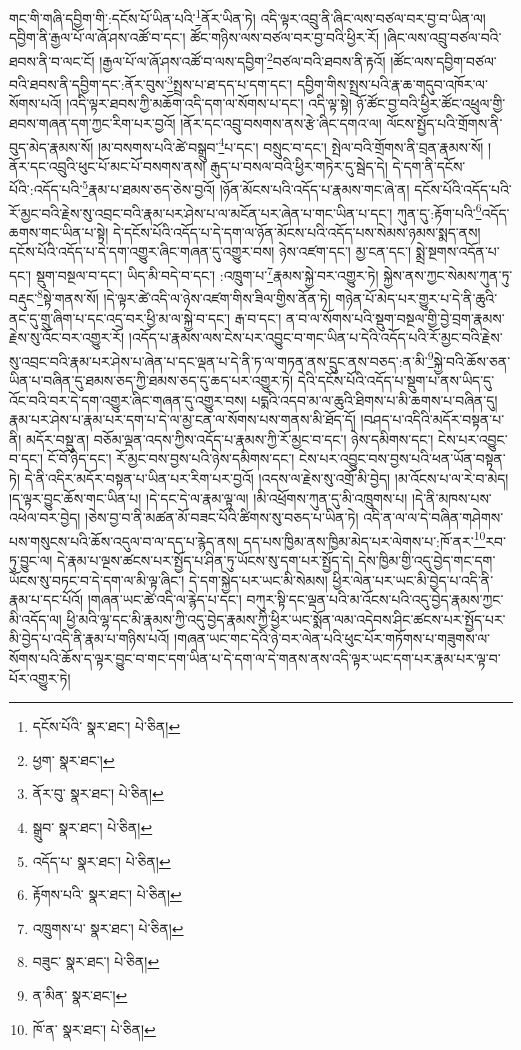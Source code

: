 གང་གི་གཞི་དབྱིག་གི་:དངོས་པོ་ཡིན་པའི་\footnote{དངོས་པོའི་  སྣར་ཐང་།  པེ་ཅིན། }ནོར་ཡིན་ཏེ། འདི་ལྟར་འབྲུ་ནི་ཞིང་ལས་བཙལ་བར་བྱ་བ་ཡིན་ལ། དབྱིག་ནི་རྒྱལ་པོ་ལ་ཞོ་ཤས་འཚོ་བ་དང་། ཚོང་གཉིས་ལས་བཙལ་བར་བྱ་བའི་ཕྱིར་རོ། །ཞིང་ལས་འབྲུ་བཙལ་བའི་ཐབས་ནི་བ་ལང་ངོ། །རྒྱལ་པོ་ལ་ཞོ་ཤས་འཚོ་བ་ལས་དབྱིག་\footnote{ཕྱག་  སྣར་ཐང་། }བཙལ་བའི་ཐབས་ནི་རྟའོ། །ཚོང་ལས་དབྱིག་བཙལ་བའི་ཐབས་ནི་དབྱིག་དང་:ནོར་བུས་\footnote{ནོར་བུ་  སྣར་ཐང་།  པེ་ཅིན། }སྤྲས་པ་ཐ་དད་པ་དག་དང་། དབྱིག་གིས་སྤྲས་པའི་རྣ་ཆ་གདུབ་འཁོར་ལ་སོགས་པའོ། །འདི་ལྟར་ཐབས་ཀྱི་མཆོག་འདི་དག་ལ་སོགས་པ་དང་། འདི་ལྟ་སྟེ། ཉོ་ཚོང་བྱ་བའི་ཕྱིར་ཚོང་འཕྲུལ་གྱི་ཐབས་གཞན་དག་ཀྱང་རིག་པར་བྱའོ། །ནོར་དང་འབྲུ་བསགས་ནས་རྩེ་ཞིང་དགའ་ལ། ལོངས་སྤྱོད་པའི་གྲོགས་ནི་བུད་མེད་རྣམས་སོ། །མ་བསགས་པའི་ཚེ་བསྒྲུབ་\footnote{སྒྲུབ་  སྣར་ཐང་།  པེ་ཅིན། }པ་དང་། བསྲུང་བ་དང་། སྤེལ་བའི་གྲོགས་ནི་བྲན་རྣམས་སོ། །
ནོར་དང་འབྲུའི་ཕུང་པོ་མང་པོ་བསགས་ནས། རྒུད་པ་བསལ་བའི་ཕྱིར་གཏེར་དུ་སྦེད་དེ། དེ་དག་ནི་དངོས་པོའི་:འདོད་པའི་\footnote{འདོད་པ་  སྣར་ཐང་།  པེ་ཅིན། }རྣམ་པ་ཐམས་ཅད་ཅེས་བྱའོ། །ཉོན་མོངས་པའི་འདོད་པ་རྣམས་གང་ཞེ་ན། དངོས་པོའི་འདོད་པའི་རོ་མྱང་བའི་རྗེས་སུ་འབྲང་བའི་རྣམ་པར་ཤེས་པ་ལ་མངོན་པར་ཞེན་པ་གང་ཡིན་པ་དང་། ཀུན་དུ་:རྟོག་པའི་\footnote{རྟོགས་པའི་  སྣར་ཐང་།  པེ་ཅིན། }འདོད་ཆགས་གང་ཡིན་པ་སྟེ། དེ་དངོས་པོའི་འདོད་པ་དེ་དག་ལ་ཉོན་མོངས་པའི་འདོད་པས་སེམས་ཉམས་སྨད་ནས། དངོས་པོའི་འདོད་པ་དེ་དག་འགྱུར་ཞིང་གཞན་དུ་འགྱུར་བས། ཉེས་འཛག་དང་། མྱ་ངན་དང་། སྨྲེ་སྔགས་འདོན་པ་དང་། སྡུག་བསྔལ་བ་དང་། ཡིད་མི་བདེ་བ་དང་། :འཁྲུག་པ་\footnote{འཁྲུགས་པ་  སྣར་ཐང་།  པེ་ཅིན། }རྣམས་སྐྱེ་བར་འགྱུར་ཏེ། སྐྱེས་ནས་ཀྱང་སེམས་ཀུན་ཏུ་བརྡུང་\footnote{བཟུང་  སྣར་ཐང་།  པེ་ཅིན། }སྟེ་གནས་སོ། །དེ་ལྟར་ཚེ་འདི་ལ་ཉེས་འཛག་གིས་ཟིལ་གྱིས་ནོན་ཏེ། གཉེན་པོ་མེད་པར་གྱུར་པ་དེ་ནི་ཆུའི་ནང་དུ་གྲུ་ཞིག་པ་དང་འདྲ་བར་ཕྱི་མ་ལ་སྐྱེ་བ་དང་། རྒ་བ་དང་། ན་བ་ལ་སོགས་པའི་སྡུག་བསྔལ་གྱི་བྱེ་བྲག་རྣམས་རྗེས་སུ་འོང་བར་འགྱུར་རོ། །འདོད་པ་རྣམས་ལས་ངེས་པར་འབྱུང་བ་གང་ཡིན་པ་དེའི་འདོད་པའི་རོ་མྱང་བའི་རྗེས་སུ་འབྲང་བའི་རྣམ་པར་ཤེས་པ་ཞེན་པ་དང་ལྡན་པ་དེ་ནི་ཏ་ལ་གཏན་ནས་དྲུང་ནས་བཅད་:ན་མི་\footnote{ན་མིན་  སྣར་ཐང་། }སྐྱེ་བའི་ཆོས་ཅན་ཡིན་པ་བཞིན་དུ་ཐམས་ཅད་ཀྱི་ཐམས་ཅད་དུ་ཆད་པར་འགྱུར་ཏེ། དེའི་དངོས་པོའི་འདོད་པ་སྡུག་པ་ནས་ཡིད་དུ་འོང་བའི་བར་དེ་དག་འགྱུར་ཞིང་གཞན་དུ་འགྱུར་བས། པདྨའི་འདབ་མ་ལ་ཆུའི་ཐིགས་པ་མི་ཆགས་པ་བཞིན་དུ། རྣམ་པར་ཤེས་པ་རྣམ་པར་དག་པ་དེ་ལ་མྱ་ངན་ལ་སོགས་པས་གནས་མི་ཐོད་དོ། །བཤད་པ་འདིའི་མདོར་བསྟན་པ་ནི། མདོར་བསྡུ་ན། བཅོམ་ལྡན་འདས་ཀྱིས་འདོད་པ་རྣམས་ཀྱི་རོ་མྱང་བ་དང་། ཉེས་དམིགས་དང་། ངེས་པར་འབྱུང་བ་དང་། ངོ་བོ་ཉིད་དང་། རོ་མྱང་བས་བྱས་པའི་ཉེས་དམིགས་དང་། ངེས་པར་འབྱུང་བས་བྱས་པའི་ཕན་ཡོན་བསྟན་ཏེ། དེ་ནི་འདིར་མདོར་བསྟན་པ་ཡིན་པར་རིག་པར་བྱའོ། །འདས་ལ་རྗེས་སུ་འགྲོ་མི་བྱེད། །མ་འོངས་པ་ལ་རེ་བ་མེད། །ད་ལྟར་བྱུང་ཆོས་གང་ཡིན་པ། །དེ་དང་དེ་ལ་རྣམ་ལྟ་ལ། །མི་འཕྲོགས་ཀུན་དུ་མི་འཁྲུགས་པ། །དེ་ནི་མཁས་པས་འཕེལ་བར་བྱེད། །ཅེས་བྱ་བ་ནི་མཚན་མོ་བཟང་པོའི་ཚིགས་སུ་བཅད་པ་ཡིན་ཏེ། འདི་ན་ལ་ལ་དེ་བཞིན་གཤེགས་པས་གསུངས་པའི་ཆོས་འདུལ་བ་ལ་དད་པ་རྙེད་ནས། དད་པས་ཁྱིམ་ནས་ཁྱིམ་མེད་པར་ལེགས་པ་:ཁོ་ནར་\footnote{ཁོ་ན་  སྣར་ཐང་།  པེ་ཅིན། }རབ་ཏུ་བྱུང་ལ། དེ་རྣམ་པ་ལྔས་ཚངས་པར་སྤྱོད་པ་ཤིན་ཏུ་ཡོངས་སུ་དག་པར་སྤྱོད་དེ། དེས་ཁྱིམ་གྱི་འདུ་བྱེད་གང་དག་ཡོངས་སུ་བཏང་བ་དེ་དག་ལ་མི་ལྟ་ཞིང་། དེ་དག་སྐྱེད་པར་ཡང་མི་སེམས། ཕྱིར་ལེན་པར་ཡང་མི་བྱེད་པ་འདི་ནི་རྣམ་པ་དང་པོའོ། །གཞན་ཡང་ཚེ་འདི་ལ་རྙེད་པ་དང་། བཀུར་སྟི་དང་ལྡན་པའི་མ་འོངས་པའི་འདུ་བྱེད་རྣམས་ཀྱང་མི་འདོད་ལ། ཕྱི་མའི་ལྷ་དང་མི་རྣམས་ཀྱི་འདུ་བྱེད་རྣམས་ཀྱི་ཕྱིར་ཡང་སྨོན་ལམ་འདེབས་ཤིང་ཚངས་པར་སྤྱོད་པར་མི་བྱེད་པ་འདི་ནི་རྣམ་པ་གཉིས་པའོ། །གཞན་ཡང་གང་དེའི་ཉེ་བར་ལེན་པའི་ཕུང་པོར་གཏོགས་པ་གཟུགས་ལ་སོགས་པའི་ཆོས་ད་ལྟར་བྱུང་བ་གང་དག་ཡིན་པ་དེ་དག་ལ་དེ་གནས་ནས་འདི་ལྟར་ཡང་དག་པར་རྣམ་པར་ལྟ་བ་པོར་འགྱུར་ཏེ། 